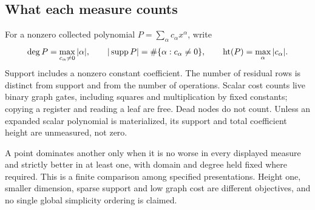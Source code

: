 \subsection{What each measure counts}
For a nonzero collected polynomial $P=\sum_\alpha c_\alpha x^\alpha$, write
\[
 \deg P=\max_{c_\alpha\ne0}|\alpha|,\qquad
 |\operatorname{supp} P|=\#\{\alpha:c_\alpha\ne0\},\qquad
 \operatorname{ht}(P)=\max_\alpha|c_\alpha|.
\]
Support includes a nonzero constant coefficient. The number of residual
rows is distinct from support and from the number of operations. Scalar
cost counts live binary graph gates, including squares and multiplication
by fixed constants; copying a register and reading a leaf are free. Dead
nodes do not count. Unless an expanded scalar polynomial is materialized,
its support and total coefficient height are unmeasured, not zero.

A point dominates another only when it is no worse in every displayed
measure and strictly better in at least one, with domain and degree held
fixed where required. This is a finite comparison among specified
presentations. Height one, smaller dimension, sparse support and low graph
cost are different objectives, and no single global simplicity ordering is
claimed.
